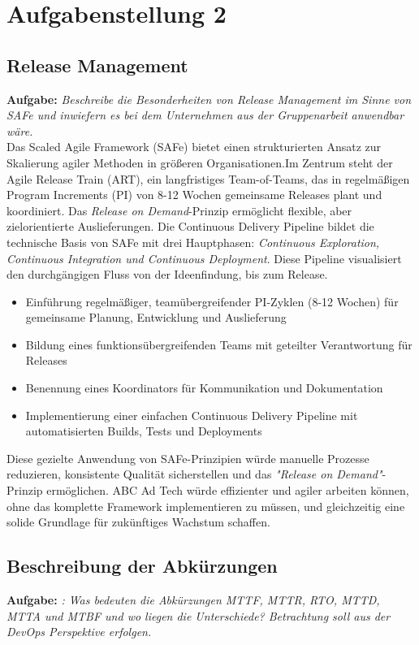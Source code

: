 \newpage
\section{Aufgabenstellung 2}


\subsection{Release Management}
\textbf{Aufgabe:} \textit{Beschreibe die Besonderheiten von Release Management im Sinne von
SAFe und inwiefern es bei dem Unternehmen aus der Gruppenarbeit anwendbar wäre.}
\\
Das Scaled Agile Framework (SAFe) bietet einen strukturierten Ansatz zur Skalierung agiler Methoden in größeren Organisationen.Im Zentrum steht der Agile Release Train (ART), ein langfristiges Team-of-Teams, das in regelmäßigen Program Increments (PI) von 8-12 Wochen gemeinsame Releases plant und koordiniert.
Das \textit{Release on Demand}-Prinzip ermöglicht flexible, aber zielorientierte Auslieferungen.
\linebreak
Die Continuous Delivery Pipeline bildet die technische Basis von SAFe mit drei Hauptphasen: \textit{Continuous Exploration, Continuous Integration und Continuous Deployment}. Diese Pipeline visualisiert den durchgängigen Fluss von der Ideenfindung, bis zum Release.\cite{atlassian_safe,apwide_safe}
\begin{itemize}
    \item Einführung regelmäßiger, teamübergreifender PI-Zyklen (8-12 Wochen) für gemeinsame Planung, Entwicklung und Auslieferung
    \item Bildung eines funktionsübergreifenden Teams mit geteilter Verantwortung für Releases
    \item Benennung eines Koordinators für Kommunikation und Dokumentation
    \item Implementierung einer einfachen Continuous Delivery Pipeline mit automatisierten Builds, Tests und Deployments
\end{itemize}
Diese gezielte Anwendung von SAFe-Prinzipien würde manuelle Prozesse reduzieren, konsistente Qualität sicherstellen und das \textit{"Release on Demand"}-Prinzip ermöglichen. ABC Ad Tech würde effizienter und agiler arbeiten können, ohne das komplette Framework implementieren zu müssen, und gleichzeitig eine solide Grundlage für zukünftiges Wachstum schaffen.



\subsection{Beschreibung der Abkürzungen}
\textbf{Aufgabe:} \textit{: Was bedeuten die Abkürzungen MTTF, MTTR, RTO, MTTD, MTTA und MTBF und
wo liegen die Unterschiede? Betrachtung soll aus der DevOps Perspektive erfolgen.}

